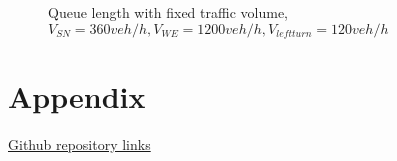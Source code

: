 \documentclass{article}
\begin{document}
\begin{figure}[htbp]

    \centering
    \caption{Queue length with fixed traffic volume, $V_{SN}=360 veh/h, V_{WE} = 1200 veh/h, V_{left turn}= 120 veh/h$}
    \label{fig:new_data}
\end{figure}

\section{Appendix}


\href{https://github.com/jiaj15/UgThesis/tree/dev}{Github repository links}

% 
% 
\end{document}
